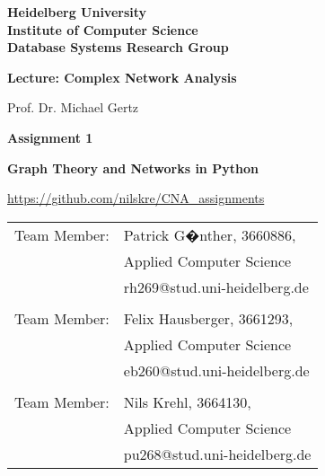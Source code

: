 \documentclass[
     12pt,         %
     a4paper,      %
     BCOR10mm,     %
     DIV14,        %
     ]{article}
\theoremstyle{defi}
\begin{document}
\begin{titlepage}

\vspace*{1cm}
\begin{center}
\textbf{ 
\Large Heidelberg University\\
\smallskip
\Large Institute of Computer Science\\
\smallskip
\Large Database Systems Research Group\\
\smallskip
}

\vspace{3cm}

\textbf{\large Lecture: Complex Network Analysis}

\vspace{0.5cm}
Prof. Dr. Michael Gertz

\vspace{2cm}

\vspace{0.5\baselineskip}
{\huge
\textbf{Assignment 1}
}

\textbf{\large Graph Theory and Networks in Python}
\vspace{0.5cm}

\url{https://github.com/nilskre/CNA_assignments}


\end{center}

\vfill 

{\large
\begin{tabular}[l]{ll}
Team Member: & Patrick G�nther, 3660886,\\
  & Applied Computer Science\\
  & rh269@stud.uni-heidelberg.de\\
  & \\
Team Member: & Felix Hausberger, 3661293,\\
  & Applied Computer Science\\
  & eb260@stud.uni-heidelberg.de\\
  & \\
Team Member: & Nils Krehl, 3664130,\\
  & Applied Computer Science\\
  & pu268@stud.uni-heidelberg.de\\
  
\end{tabular}
}

\end{titlepage}

\newpage




\clearpage
{}
\end{document}
